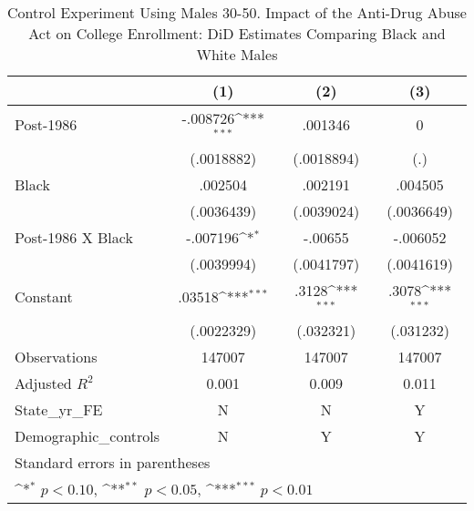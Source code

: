 \begin{table}[htbp]\centering
\def\sym#1{\ifmmode^{#1}\else\(^{#1}\)\fi}
\caption{Control Experiment Using Males 30-50. Impact of the Anti-Drug Abuse Act on College Enrollment: DiD Estimates Comparing Black and White Males}
\begin{tabular}{l*{3}{c}}
\hline\hline
                    &\multicolumn{1}{c}{(1)}         &\multicolumn{1}{c}{(2)}         &\multicolumn{1}{c}{(3)}         \\
\hline
Post-1986           &    -.008726\sym{***}&     .001346         &           0         \\
                    &  (.0018882)         &  (.0018894)         &         (.)         \\
[1em]
Black               &     .002504         &     .002191         &     .004505         \\
                    &  (.0036439)         &  (.0039024)         &  (.0036649)         \\
[1em]
Post-1986 X Black   &    -.007196\sym{*}  &     -.00655         &    -.006052         \\
                    &  (.0039994)         &  (.0041797)         &  (.0041619)         \\
[1em]
Constant            &      .03518\sym{***}&       .3128\sym{***}&       .3078\sym{***}\\
                    &  (.0022329)         &   (.032321)         &   (.031232)         \\
\hline
Observations        &      147007         &      147007         &      147007         \\
Adjusted \(R^{2}\)  &       0.001         &       0.009         &       0.011         \\
State\_yr\_FE         &           N         &           N         &           Y         \\
Demographic\_controls&           N         &           Y         &           Y         \\
\hline\hline
\multicolumn{4}{l}{\footnotesize Standard errors in parentheses}\\
\multicolumn{4}{l}{\footnotesize \sym{*} \(p<0.10\), \sym{**} \(p<0.05\), \sym{***} \(p<0.01\)}\\
\end{tabular}
\end{table}
